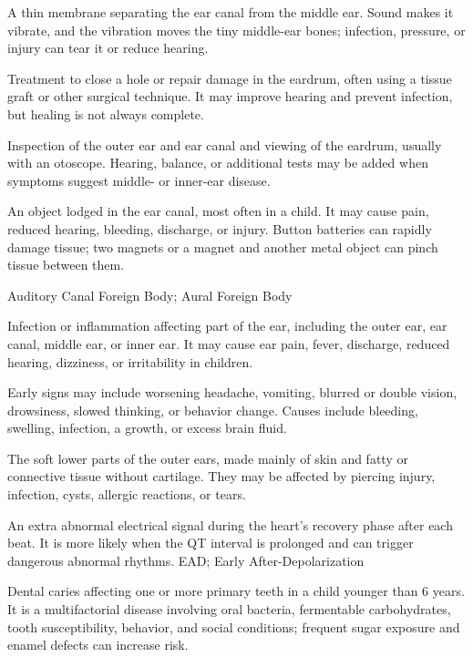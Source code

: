  A thin membrane separating the ear canal from the middle ear. Sound makes it vibrate, and the vibration moves the tiny middle-ear bones; infection, pressure, or injury can tear it or reduce hearing.

 Treatment to close a hole or repair damage in the eardrum, often using a tissue graft or other surgical technique. It may improve hearing and prevent infection, but healing is not always complete.

 Inspection of the outer ear and ear canal and viewing of the eardrum, usually with an otoscope. Hearing, balance, or additional tests may be added when symptoms suggest middle- or inner-ear disease.

 An object lodged in the ear canal, most often in a child. It may cause pain, reduced hearing, bleeding, discharge, or injury. Button batteries can rapidly damage tissue; two magnets or a magnet and another metal object can pinch tissue between them.

\synonyms
Auditory Canal Foreign Body; Aural Foreign Body

 Infection or inflammation affecting part of the ear, including the outer ear, ear canal, middle ear, or inner ear. It may cause ear pain, fever, discharge, reduced hearing, dizziness, or irritability in children.

 Early signs may include worsening headache, vomiting, blurred or double vision, drowsiness, slowed thinking, or behavior change. Causes include bleeding, swelling, infection, a growth, or excess brain fluid.

 The soft lower parts of the outer ears, made mainly of skin and fatty or connective tissue without cartilage. They may be affected by piercing injury, infection, cysts, allergic reactions, or tears.

 An extra abnormal electrical signal during the heart’s recovery phase after each beat. It is more likely when the QT interval is prolonged and can trigger dangerous abnormal rhythms.
\synonyms
EAD; Early After-Depolarization

 Dental caries affecting one or more primary teeth in a child younger than 6 years. It is a multifactorial disease involving oral bacteria, fermentable carbohydrates, tooth susceptibility, behavior, and social conditions; frequent sugar exposure and enamel defects can increase risk.

